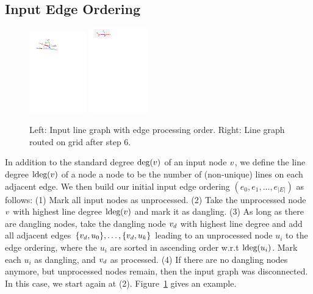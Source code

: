 \documentclass[sigconf]{acmart}
\begin{document}
\subsection{Input Edge Ordering}
%
\begin{figure}
  \centering
	\includegraphics[width=0.219\textwidth]{figures/node_order.pdf}
	\hfill
	\includegraphics[width=0.229\textwidth]{figures/partial_drawn.pdf}
	\vspace{-.3cm}
	\caption{Left: Input line graph with edge processing order. Right: Line graph routed on grid after step 6.}
	\label{FIG:order}
\end{figure}
%
In addition to the standard degree $\deg(v)$ of an input node $v$, we define the line degree $\text{ldeg}(v)$ of a node a node to be the number of (non-unique) lines on each adjacent edge.
We then build our initial input edge ordering $(e_0, e_1, \dots, e_{|E|})$ as follows:
  (1) Mark all input nodes as unprocessed.
  (2) Take the unprocessed node $v$ with highest line degree $\text{ldeg}(v)$ and mark it as dangling.
  (3) As long as there are dangling nodes, take the dangling node $v_d$ with highest line degree and add all adjacent edges $\{v_d, u_0\}, \dots, \{v_d, u_k\}$ leading to an unprocessed node $u_i$ to the edge ordering, where the $u_i$ are sorted in ascending order w.r.t $\text{ldeg}(u_i)$. Mark each $u_i$ as dangling, and $v_d$ as processed. 
  (4) If there are no dangling nodes anymore, but unprocessed nodes remain, then the input graph was disconnected. In this case, we start again at (2).
Figure~\ref{FIG:order} gives an example.
\end{document}
